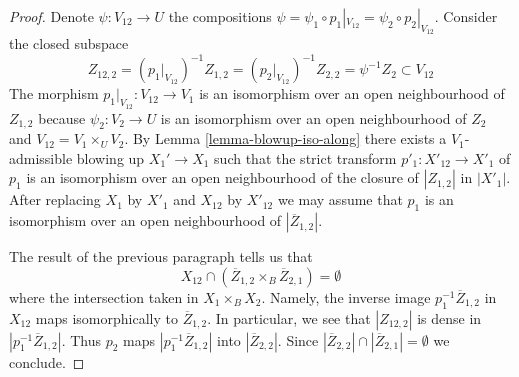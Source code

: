 \documentclass{stacks-project}
\theoremstyle{plain}
\theoremstyle{definition}
\theoremstyle{remark}
\numberwithin{equation}{subsection}
\begin{document}
\begin{proof}
\medskip\noindent
Denote $\psi : V_{12} \to U$ the compositions
$\psi = \psi_1 \circ p_1|_{V_{12}} = \psi_2 \circ p_2|_{V_{12}}$.
Consider the closed subspace
$$
Z_{12, 2} =
(p_1|_{V_{12}})^{-1}Z_{1, 2} =
(p_2|_{V_{12}})^{-1}Z_{2, 2} =
\psi^{-1}Z_2 \subset V_{12}
$$
The morphism $p_1|_{V_{12}} : V_{12} \to V_1$ is an isomorphism
over an open neighbourhood of $Z_{1, 2}$ because $\psi_2 : V_2 \to U$
is an isomorphism over an open neighbourhood of $Z_2$ and
$V_{12} = V_1 \times_U V_2$. By Lemma \ref{lemma-blowup-iso-along}
there exists a $V_1$-admissible blowing up $X_1' \to X_1$
such that the strict transform $p'_1 : X'_{12} \to X'_1$
of $p_1$ is an isomorphism over an open neighbourhood of
the closure of $|Z_{1, 2}|$ in $|X'_1|$.
After replacing $X_1$ by $X'_1$ and $X_{12}$ by $X'_{12}$
we may assume that $p_1$ is an isomorphism over an open
neighbourhood of $|\overline{Z}_{1, 2}|$.

\medskip\noindent
The result of the previous paragraph tells us that
$$
X_{12} \cap (\overline{Z}_{1, 2} \times_B \overline{Z}_{2, 1}) = \emptyset
$$
where the intersection taken in $X_1 \times_B X_2$. Namely, the inverse
image $p_1^{-1}\overline{Z}_{1, 2}$ in $X_{12}$ maps isomorphically
to $\overline{Z}_{1, 2}$. In particular, we see that $|Z_{12, 2}|$
is dense in $|p_1^{-1}\overline{Z}_{1, 2}|$. Thus $p_2$ maps
$|p_1^{-1}\overline{Z}_{1, 2}|$ into $|\overline{Z}_{2, 2}|$.
Since $|\overline{Z}_{2, 2}| \cap |\overline{Z}_{2, 1}| = \emptyset$
we conclude.


\end{proof}
\end{document}
